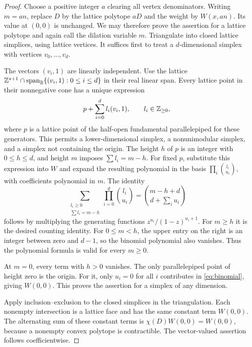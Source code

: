 \begin{proof}
Choose a positive integer \(a\) clearing all vertex denominators.
Writing \(m=an\), replace \(D\) by the lattice polytope \(aD\) and
the weight by \(W(x,an)\). Its value at \((0,0)\) is unchanged.
We may therefore prove the assertion for a lattice polytope and again
call the dilation variable \(m\). Triangulate into closed lattice
simplices, using lattice vertices. It suffices first to treat a
\(d\)-dimensional simplex with vertices \(v_0,\ldots,v_d\).

The vectors \((v_i,1)\) are linearly independent. Use the lattice
\(\mathbb Z^{s+1}\cap\operatorname{span}_{\mathbb R}\{(v_i,1):0\le i\le d\}\)
in their real linear span. Every lattice point in their nonnegative
cone has a unique expression
\[
p+\sum_{i=0}^d l_i(v_i,1),\qquad l_i\in\mathbb Z_{\ge0},
\]
where \(p\) is a lattice point of the half-open fundamental
parallelepiped for these generators. This permits a lower-dimensional
simplex, a nonunimodular simplex, and a simplex not containing the
origin. The height \(h\) of \(p\) is an integer with
\(0\le h\le d\), and height \(m\) imposes
\(\sum l_i=m-h\).
For fixed \(p\), substitute this expression into \(W\) and expand the
resulting polynomial in the basis
\(\prod_i\binom{l_i}{u_i}\), with coefficients polynomial in \(m\).
The identity
\begin{equation}\label{eq:binomial}
\sum_{\substack{l_i\ge0\\\sum l_i=m-h}}
\prod_{i=0}^d\binom{l_i}{u_i}
=
\binom{m-h+d}{d+\sum_i u_i}
\end{equation}
follows by multiplying the generating functions
\(z^{u_i}/(1-z)^{u_i+1}\).
For \(m\ge h\) it is the desired counting identity.
For \(0\le m<h\), the upper entry on the right is an integer between
zero and \(d-1\), so the binomial polynomial also vanishes.
Thus the polynomial formula is valid for every \(m\ge0\).

At \(m=0\), every term with \(h>0\) vanishes. The only parallelepiped
point of height zero is the origin. For it, only \(u_i=0\) for all \(i\)
contributes in \eqref{eq:binomial}, giving \(W(0,0)\).
This proves the assertion for a simplex of any dimension.

Apply inclusion--exclusion to the closed simplices in the triangulation.
Each nonempty intersection is a lattice face and has the same constant
term \(W(0,0)\). The alternating sum of these constant terms is
\(\chi(D)W(0,0)=W(0,0)\), because a nonempty convex polytope is
contractible. The vector-valued assertion follows coefficientwise.
\end{proof}

